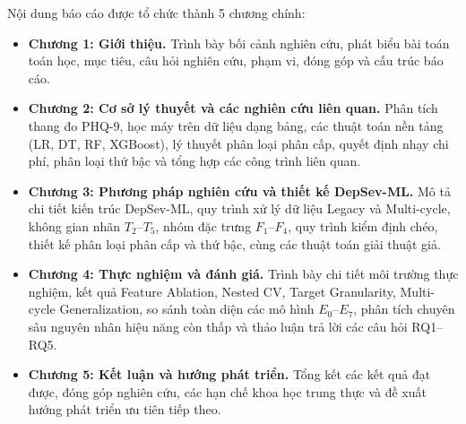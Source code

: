 Nội dung báo cáo được tổ chức thành 5 chương chính:
\begin{itemize}
    \item \textbf{Chương 1: Giới thiệu.} Trình bày bối cảnh nghiên cứu, phát biểu bài toán toán học, mục tiêu, câu hỏi nghiên cứu, phạm vi, đóng góp và cấu trúc báo cáo.
    \item \textbf{Chương 2: Cơ sở lý thuyết và các nghiên cứu liên quan.} Phân tích thang đo PHQ-9, học máy trên dữ liệu dạng bảng, các thuật toán nền tảng (LR, DT, RF, XGBoost), lý thuyết phân loại phân cấp, quyết định nhạy chi phí, phân loại thứ bậc và tổng hợp các công trình liên quan.
    \item \textbf{Chương 3: Phương pháp nghiên cứu và thiết kế DepSev-ML.} Mô tả chi tiết kiến trúc DepSev-ML, quy trình xử lý dữ liệu Legacy và Multi-cycle, không gian nhãn $T_2$--$T_5$, nhóm đặc trưng $F_1$--$F_4$, quy trình kiểm định chéo, thiết kế phân loại phân cấp và thứ bậc, cùng các thuật toán giải thuật giả.
    \item \textbf{Chương 4: Thực nghiệm và đánh giá.} Trình bày chi tiết môi trường thực nghiệm, kết quả Feature Ablation, Nested CV, Target Granularity, Multi-cycle Generalization, so sánh toàn diện các mô hình $E_0$--$E_7$, phân tích chuyên sâu nguyên nhân hiệu năng còn thấp và thảo luận trả lời các câu hỏi RQ1--RQ5.
    \item \textbf{Chương 5: Kết luận và hướng phát triển.} Tổng kết các kết quả đạt được, đóng góp nghiên cứu, các hạn chế khoa học trung thực và đề xuất hướng phát triển ưu tiên tiếp theo.
\end{itemize}
\cleardoublepage

